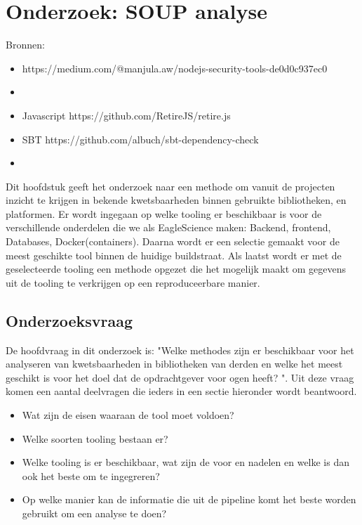 \chapter{Onderzoek: SOUP analyse}\label{ch:onderzoek:-soup-analyse} %
Bronnen:

\begin{itemize}
    \item https://medium.com/@manjula.aw/nodejs-security-tools-de0d0c937ec0
    \item
\end{itemize}
\begin{itemize}
    \item Javascript     https://github.com/RetireJS/retire.js
    \item SBT https://github.com/albuch/sbt-dependency-check
    \item
\end{itemize}

Dit hoofdstuk geeft het onderzoek naar een methode om vanuit de projecten inzicht te krijgen in bekende kwetsbaarheden binnen gebruikte bibliotheken, en platformen. Er wordt ingegaan op welke tooling er beschikbaar is voor de verschillende onderdelen die we als EagleScience maken: Backend, frontend, Databases, Docker(containers). Daarna wordt er een selectie gemaakt voor de meest geschikte tool binnen de huidige buildstraat. Als laatst wordt er met de geselecteerde tooling een methode opgezet die het mogelijk maakt om gegevens uit de tooling te verkrijgen op een reproduceerbare manier.

\section{Onderzoeksvraag}\label{sec:onderzoeksvraag}
De hoofdvraag in dit onderzoek is: "Welke methodes zijn er beschikbaar voor het analyseren van kwetsbaarheden in bibliotheken van derden en welke het meest geschikt is voor het doel dat de opdrachtgever voor ogen heeft? ". Uit deze vraag komen een aantal deelvragen die ieders in een sectie hieronder wordt beantwoord.
\begin{itemize}
    \item Wat zijn de eisen waaraan de tool moet voldoen?
    \item Welke soorten tooling bestaan er?
    \item Welke tooling is er beschikbaar, wat zijn de voor en nadelen en welke is dan ook het beste om te ingegreren?
    \item Op welke manier kan de informatie die uit de pipeline komt het beste worden gebruikt om een analyse te doen?
\end{itemize}

